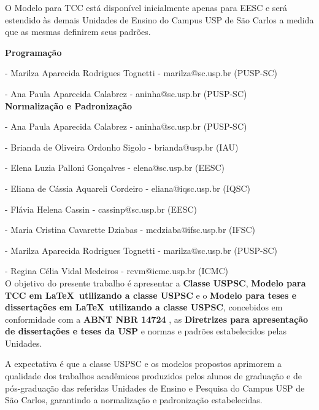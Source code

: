O Modelo para TCC está disponível inicialmente apenas para EESC e será estendido às demais Unidades de Ensino do Campus USP de São Carlos a medida que as mesmas definirem seus padrões.

\textbf{Programação}

  - Marilza Aparecida Rodrigues Tognetti - marilza@sc.usp.br (PUSP-SC)
		
  - Ana Paula Aparecida Calabrez - aninha@sc.usp.br (PUSP-SC) \\
	
	
\textbf{Normalização e Padronização}

   - Ana Paula Aparecida Calabrez - aninha@sc.usp.br (PUSP-SC)
	
   - Brianda de Oliveira Ordonho Sigolo - brianda@usp.br (IAU)	
	
   - Elena Luzia Palloni Gonçalves - elena@sc.usp.br (EESC)	
	
   - Eliana de Cássia Aquareli Cordeiro - eliana@iqsc.usp.br (IQSC)	
	
   - Flávia Helena Cassin - cassinp@sc.usp.br (EESC)
	
   - Maria Cristina Cavarette Dziabas - mcdziaba@ifsc.usp.br (IFSC)
	
	 - Marilza Aparecida Rodrigues Tognetti - marilza@sc.usp.br (PUSP-SC)
	
	 - Regina Célia Vidal Medeiros - rcvm@icmc.usp.br (ICMC) \\
	
	O objetivo do presente trabalho é apresentar a \textbf{Classe USPSC}, \textbf{Modelo para TCC em \LaTeX\ utilizando a classe USPSC} e o \textbf{Modelo para teses e dissertações em \LaTeX\ utilizando a classe USPSC}, concebidos em conformidade com a \textbf{ABNT NBR 14724} \cite{nbr14724}, as \textbf{Diretrizes para apresentação de dissertações e teses da USP} \cite{sibi2016} e normas e padrões estabelecidos pelas Unidades. 
	
	A expectativa é que a classe USPSC e os modelos propostos aprimorem a qualidade dos trabalhos acadêmicos produzidos pelos alunos de graduação e de pós-graduação das referidas Unidades de Ensino e Pesquisa do Campus USP de São Carlos, garantindo a normalização e padronização estabelecidas.
	
	

